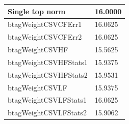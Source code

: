 \begin{table}[ht]
\begin{tabular}{|l|l|}
Single top norm                & 16.0000                                                         \\ \hline
btagWeightCSVCFErr1            & 16.0625                                                         \\ \hline
btagWeightCSVCFErr2            & 16.0625                                                         \\ \hline
btagWeightCSVHF                & 15.5625                                                         \\ \hline
btagWeightCSVHFStats1          & 15.9375                                                         \\ \hline
btagWeightCSVHFStats2          & 15.9531                                                         \\ \hline
btagWeightCSVLF                & 15.9375                                                         \\ \hline
btagWeightCSVLFStats1          & 16.0625                                                         \\ \hline
btagWeightCSVLFStats2          & 15.9062                                                         \\ \hline
\end{tabular}
\end{table}


